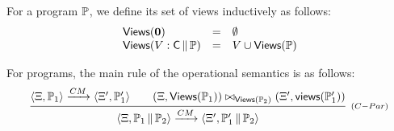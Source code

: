 \documentclass[a4paper,UKenglish]{article}%
\theoremstyle{plain}
\begin{document}
For a program $\mathbb{P}$, we define its set of views inductively as follows: 
\[
\begin{array}{lcl}
\mathsf{Views}(\mathbf{0}) &=& \emptyset \\
\mathsf{Views}(V: \mathsf{C} \mathop{\lVert} \mathbb{P}) &=& V \cup \mathsf{Views}(\mathbb{P})
\end{array}
\]

For programs, the main rule of the operational semantics is as follows: 
\[
\infer[{\scriptstyle{(C-Par)}}]
{\langle \hh, \prog_1 \Par \prog_2 \rangle \xrightarrow{CM} \langle \hh', \prog_1' \Par \prog_2 \rangle }
{\langle \hh, \prog_1 \rangle \xrightarrow{CM} \langle \hh', \prog_1' \rangle \qquad 
(\hh, \mathsf{Views}(\prog_1)) \bowtie_{\mathsf{Views}(\prog_2)} (\hh', \mathsf{views}(\prog_1'))} 
\]
%
%
\end{document}

